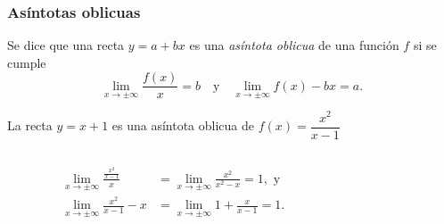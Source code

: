 	
	\begin{frame}
		\frametitle{Asíntotas oblicuas}
		\begin{definicion}
			Se dice que una recta $y=a+bx$ es una \emph{asíntota oblicua} de una función $f$ si se cumple
			\[
				\lim_{x\rightarrow \pm\infty}\frac{f(x)}{x}=b \quad \textrm{y} \quad \lim_{x\rightarrow \pm\infty}f(x)-bx=a.
			\]
		\end{definicion}
		
		 La recta $y=x+1$ es una asíntota oblicua de $f(x)=\dfrac{x^2}{x-1}$
		\begin{columns}
			\begin{column}{0.5\textwidth}
				\begin{align*}
					\lim_{x\rightarrow \pm\infty}\frac{\frac{x^2}{x-1}}{x} & = 
					\lim_{x\rightarrow \pm\infty}\frac{x^2}{x^2-x} = 1, \textrm{ y}\\
					\lim_{x\rightarrow \pm\infty}\frac{x^2}{x-1}-x         & = 
					\lim_{x\rightarrow \pm\infty}1+\frac{x}{x-1} = 1.
				\end{align*}
			\end{column}
			\begin{column}{0.5\textwidth}
				\begin{center}
					\scalebox{1}{}
				\end{center}
			\end{column}
		\end{columns}
	\end{frame}
	
	
	
